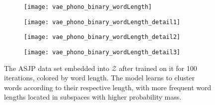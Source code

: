 \documentclass[6pt]{article}
\begin{document}
    
    \begin{figure}[ht] 
  \begin{subfigure}[b]{0.5\linewidth}
    \centering
    \texttt{[image: vae\_phono\_binary\_wordLength]} 
    \label{fig:vae_phono_binary_wordLength0} 
    \vspace{4ex}
  \end{subfigure}%
  \begin{subfigure}[b]{0.5\linewidth}
    \centering
    \texttt{[image: vae\_phono\_binary\_wordLength\_detail1]} 
    \label{fig:vae_phono_binary_wordLength1} 
    \vspace{4ex}
  \end{subfigure} 
  \begin{subfigure}[b]{0.5\linewidth}
    \centering
    \texttt{[image: vae\_phono\_binary\_wordLength\_detail2]} 
    \label{fig:vae_phono_binary_wordLength2} 
  \end{subfigure}%
  \begin{subfigure}[b]{0.5\linewidth}
    \centering
    \texttt{[image: vae\_phono\_binary\_wordLength\_detail3]} 
    \label{fig:vae_phono_binary_wordLength3} 
  \end{subfigure} 
  \caption{The ASJP data set embedded into $\mathcal{Z}$ after trained on it for 100 iterations, colored by word length. The model learns to cluster words according to their respective length, with more frequent word lengths located in subspaces with higher probability mass.}
  \label{fig:vae_phono_binary_wordLength} 
\end{figure}
\end{document}
